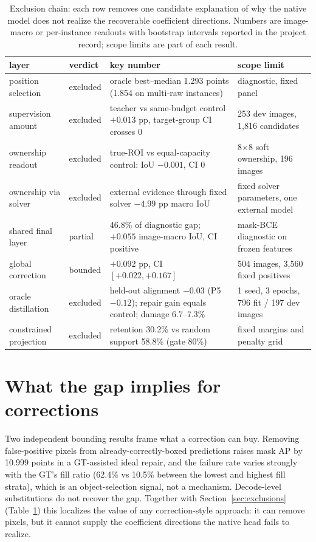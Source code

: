 ﻿\documentclass[times,twocolumn,final,authoryear]{elsarticle}
\begin{document}
\begin{table}[t]
\caption{Exclusion chain: each row removes one candidate explanation of why the native model does
not realize the recoverable coefficient directions. Numbers are image-macro or per-instance
readouts with bootstrap intervals reported in the project record; scope limits are part of each
result.}
\label{tab:exclusions}
\centering
\begin{tabular}{@{}llp{44mm}p{32mm}@{}}
\toprule
layer & verdict & key number & scope limit \\
\midrule
position selection   & excluded & oracle best--median 1.293 points (1.854 on multi-raw instances) & diagnostic, fixed panel \\
supervision amount  & excluded & teacher vs same-budget control $+0.013$ pp, target-group CI crosses 0 & 253 dev images, 1{,}816 candidates \\
ownership readout   & excluded & true-ROI vs equal-capacity control: IoU $-0.001$, CI 0 & 8$\times$8 soft ownership, 196 images \\
ownership via solver& excluded & external evidence through fixed solver $-4.99$ pp macro IoU & fixed solver parameters, one external model \\
shared final layer  & partial   & 46.8\% of diagnostic gap; $+0.055$ image-macro IoU, CI positive & mask-BCE diagnostic on frozen features \\
global correction   & bounded   & $+0.092$ pp, CI $[+0.022,+0.167]$ & 504 images, 3{,}560 fixed positives \\
oracle distillation & excluded & held-out alignment $-0.03$ (P5 $-0.12$); repair gain equals control; damage 6.7--7.3\% & 1 seed, 3 epochs, 796 fit / 197 dev images \\
constrained projection & excluded & retention 30.2\% vs random support 58.8\% (gate 80\%) & fixed margins and penalty grid \\
\bottomrule
\end{tabular}
\end{table}

\section{What the gap implies for corrections}
Two independent bounding results frame what a correction can buy. Removing false-positive pixels
from already-correctly-boxed predictions raises mask AP by 10.999 points in a GT-assisted ideal
repair, and the failure rate varies strongly with the GT's fill ratio (62.4\% vs 10.5\%
between the lowest and highest fill strata), which is an object-selection signal, not a
mechanism. Decode-level substitutions do not recover the gap. Together with
Section~\ref{sec:exclusions} (Table~\ref{tab:exclusions}) this localizes the value of any
correction-style approach: it can remove pixels, but it cannot supply the coefficient directions
the native head fails to realize.
\end{document}

